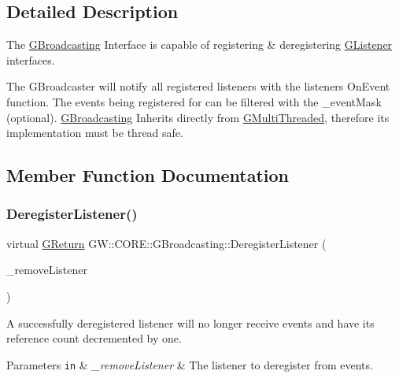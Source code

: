 \subsection{Detailed Description}
The \mbox{\hyperlink{class_g_w_1_1_c_o_r_e_1_1_g_broadcasting}{G\+Broadcasting}} Interface is capable of registering \& deregistering \mbox{\hyperlink{class_g_w_1_1_c_o_r_e_1_1_g_listener}{G\+Listener}} interfaces. 

The G\+Broadcaster will notify all registered listeners with the listeners On\+Event function. The events being registered for can be filtered with the \+\_\+event\+Mask (optional). \mbox{\hyperlink{class_g_w_1_1_c_o_r_e_1_1_g_broadcasting}{G\+Broadcasting}} Inherits directly from \mbox{\hyperlink{class_g_w_1_1_c_o_r_e_1_1_g_multi_threaded}{G\+Multi\+Threaded}}, therefore its implementation must be thread safe. 

\subsection{Member Function Documentation}
\mbox{\label{class_g_w_1_1_c_o_r_e_1_1_g_broadcasting_afd6b1f41b646c668b1fcce2580681dd5}} 
\subsubsection{\texorpdfstring{Deregister\+Listener()}{DeregisterListener()}}
{\footnotesize\ttfamily virtual \mbox{\hyperlink{namespace_g_w_a67a839e3df7ea8a5c5686613a7a3de21}{G\+Return}} G\+W\+::\+C\+O\+R\+E\+::\+G\+Broadcasting\+::\+Deregister\+Listener (\begin{DoxyParamCaption}\item[{\mbox{\hyperlink{class_g_w_1_1_c_o_r_e_1_1_g_listener}{G\+Listener}} $\ast$}]{\+\_\+remove\+Listener }\end{DoxyParamCaption})\hspace{0.3cm}{\ttfamily [pure virtual]}}



A successfully deregistered listener will no longer receive events and have its reference count decremented by one. 


\begin{DoxyParams}[1]{Parameters}
\mbox{\tt in}  & {\em \+\_\+remove\+Listener} & The listener to deregister from events.\\
\hline
\end{DoxyParams}

